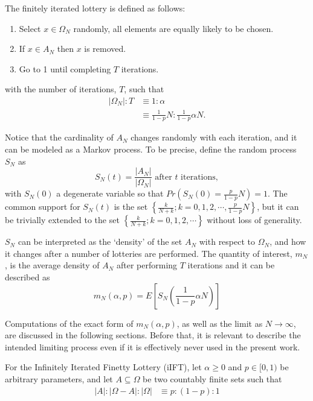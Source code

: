 \documentclass{article}
\newcommand{\card}[1]{\left| #1 \right|}
\newcommand{\sset}[1]{\left\{ #1 \right\}}
\begin{document}
The finitely iterated lottery is defined as follows:
\begin{enumerate}
    \item Select $x\in \Omega_N$ randomly, all elements are equally likely to be chosen.
    \item If $x\in A_N$ then $x$ is removed.
    \item Go to 1 until completing $T$ iterations.
\end{enumerate}
with the number of iterations, $T$, such that
\begin{align}
    \card{\Omega_N} : T &\equiv 1:\alpha
    \nonumber \\
    &\equiv
    \frac{1}{1-p} N : \frac{1}{1-p} \alpha N.
\end{align}

Notice that the cardinality of $A_N$ changes randomly with each iteration, and it can be modeled as a Markov process. 
To be precise, define the random process $S_N$ as
\begin{equation}
    S_N(t) = \frac{\card{A_N}}{\card{\Omega_N}} \text{ after } t \text{ iterations},
\end{equation}
with $S_N(0)$ a degenerate variable so that $Pr\left(S_N(0) =  \frac{p}{1-p}N\right)=1$.
%
The common support for $S_N(t)$ is the set $\sset{\frac{k}{N+k}; k = 0, 1, 2, \cdots, \frac{p}{1-p}N}$, but it can be trivially extended to the set $\sset{\frac{k}{N+k}; k = 0, 1, 2, \cdots}$ without loss of generality.

$S_N$ can be interpreted as the `density' of the set $A_N$ with respect to $\Omega_N$, and how it changes after a number of lotteries are performed.
The quantity of interest, $m_N$, is the average density of $A_N$ after performing $T$ iterations and it can be described as
\begin{equation}
    m_N(\alpha, p) = E\left[ S_N\left( \frac{1}{1-p} \alpha N \right) \right]
\end{equation}

Computations of the exact form of $m_N(\alpha, p)$, as well as the limit as $N \rightarrow \infty$, are discussed in the following sections. 
Before that, it is relevant to describe the intended limiting process even if it is effectively never used in the present work.

 For the Infinitely Iterated Finetty Lottery (iIFT), let $\alpha\geq 0$ and $p\in [0,1)$ be arbitrary parameters, and let $A \subseteq \Omega$ be two countably finite sets such that 
\begin{align}
    \card{A} : \card{\Omega-A} : \card{\Omega} 
    &\equiv p: (1-p) : 1
\end{align}
\end{document}
